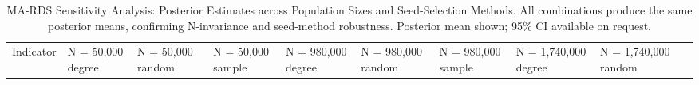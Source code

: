 \documentclass[
  12pt,
  letterpaper,
  DIV=11,
  numbers=noendperiod]{scrreprt}
\begin{document}
\begin{longtable}[]{@{}
  >{\raggedright\arraybackslash}p{}
  >{\raggedright\arraybackslash}p{}
  >{\raggedright\arraybackslash}p{}
  >{\raggedright\arraybackslash}p{}
  >{\raggedright\arraybackslash}p{}
  >{\raggedright\arraybackslash}p{}
  >{\raggedright\arraybackslash}p{}
  >{\raggedright\arraybackslash}p{}
  >{\raggedright\arraybackslash}p{}
  >{\raggedright\arraybackslash}p{}@{}}
\caption{MA-RDS Sensitivity Analysis: Posterior Estimates across
Population Sizes and Seed-Selection Methods. All combinations produce
the same posterior means, confirming N-invariance and seed-method
robustness. Posterior mean shown; 95\% CI available on
request.}\label{tbl-ma-sensitivity}\tabularnewline
\toprule\noalign{}
\begin{minipage}[b]{\linewidth}\raggedright
Indicator
\end{minipage} & \begin{minipage}[b]{\linewidth}\raggedright
N = 50,000 degree
\end{minipage} & \begin{minipage}[b]{\linewidth}\raggedright
N = 50,000 random
\end{minipage} & \begin{minipage}[b]{\linewidth}\raggedright
N = 50,000 sample
\end{minipage} & \begin{minipage}[b]{\linewidth}\raggedright
N = 980,000 degree
\end{minipage} & \begin{minipage}[b]{\linewidth}\raggedright
N = 980,000 random
\end{minipage} & \begin{minipage}[b]{\linewidth}\raggedright
N = 980,000 sample
\end{minipage} & \begin{minipage}[b]{\linewidth}\raggedright
N = 1,740,000 degree
\end{minipage} & \begin{minipage}[b]{\linewidth}\raggedright
N = 1,740,000 random
\end{minipage} & \begin{minipage}[b]{\linewidth}\raggedright

\end{minipage}
\end{longtable}
\end{document}
